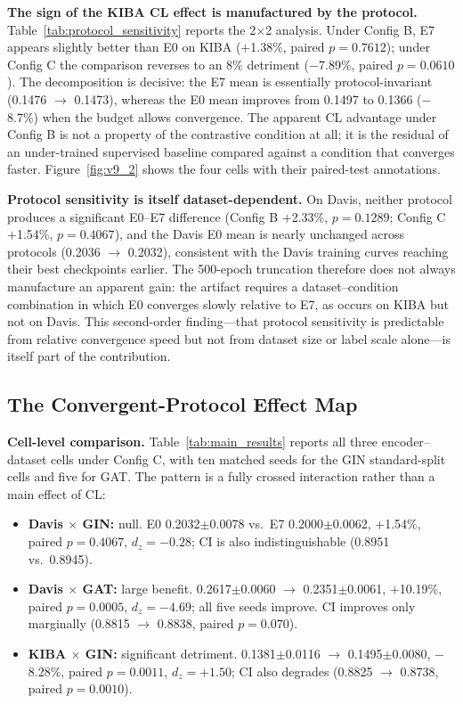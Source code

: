 \documentclass[10pt,a4paper,twocolumn]{article}
\begin{document}


\textbf{The sign of the KIBA CL effect is manufactured by the protocol.} Table~\ref{tab:protocol_sensitivity} reports the 2$\times$2 analysis. Under Config B, E7 appears slightly better than E0 on KIBA ($+$1.38\%, paired $p=0.7612$); under Config C the comparison reverses to an 8\% detriment ($-$7.89\%, paired $p=0.0610$). The decomposition is decisive: the E7 mean is essentially protocol-invariant (0.1476 $\to$ 0.1473), whereas the E0 mean improves from 0.1497 to 0.1366 ($-$8.7\%) when the budget allows convergence. The apparent CL advantage under Config B is not a property of the contrastive condition at all; it is the residual of an under-trained supervised baseline compared against a condition that converges faster. Figure~\ref{fig:v9_2} shows the four cells with their paired-test annotations.

\textbf{Protocol sensitivity is itself dataset-dependent.} On Davis, neither protocol produces a significant E0--E7 difference (Config B $+$2.33\%, $p=0.1289$; Config C $+$1.54\%, $p=0.4067$), and the Davis E0 mean is nearly unchanged across protocols (0.2036 $\to$ 0.2032), consistent with the Davis training curves reaching their best checkpoints earlier. The 500-epoch truncation therefore does not always manufacture an apparent gain: the artifact requires a dataset--condition combination in which E0 converges slowly relative to E7, as occurs on KIBA but not on Davis. This second-order finding---that protocol sensitivity is predictable from relative convergence speed but not from dataset size or label scale alone---is itself part of the contribution.

\subsection{The Convergent-Protocol Effect Map}

\textbf{Cell-level comparison.} Table~\ref{tab:main_results} reports all three encoder--dataset cells under Config C, with ten matched seeds for the GIN standard-split cells and five for GAT. The pattern is a fully crossed interaction rather than a main effect of CL:
\begin{itemize}
\item \textbf{Davis $\times$ GIN:} null. E0 0.2032$\pm$0.0078 vs.\ E7 0.2000$\pm$0.0062, $+$1.54\%, paired $p=0.4067$, $d_z=-0.28$; CI is also indistinguishable (0.8951 vs.\ 0.8945).
\item \textbf{Davis $\times$ GAT:} large benefit. 0.2617$\pm$0.0060 $\to$ 0.2351$\pm$0.0061, $+$10.19\%, paired $p=0.0005$, $d_z=-4.69$; all five seeds improve. CI improves only marginally (0.8815 $\to$ 0.8838, paired $p=0.070$).
\item \textbf{KIBA $\times$ GIN:} significant detriment. 0.1381$\pm$0.0116 $\to$ 0.1495$\pm$0.0080, $-$8.28\%, paired $p=0.0011$, $d_z=+1.50$; CI also degrades (0.8825 $\to$ 0.8738, paired $p=0.0010$).
\end{itemize}
\end{document}
